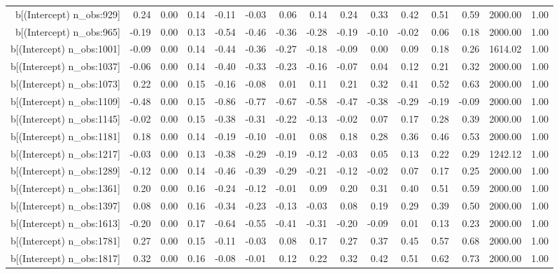 \begin{table}[ht]
\begin{tabular}{rrrrrrrrrrrrrrr}
  b[(Intercept) n\_obs:929] & 0.24 & 0.00 & 0.14 & -0.11 & -0.03 & 0.06 & 0.14 & 0.24 & 0.33 & 0.42 & 0.51 & 0.59 & 2000.00 & 1.00 \\ 
  b[(Intercept) n\_obs:965] & -0.19 & 0.00 & 0.13 & -0.54 & -0.46 & -0.36 & -0.28 & -0.19 & -0.10 & -0.02 & 0.06 & 0.18 & 2000.00 & 1.00 \\ 
  b[(Intercept) n\_obs:1001] & -0.09 & 0.00 & 0.14 & -0.44 & -0.36 & -0.27 & -0.18 & -0.09 & 0.00 & 0.09 & 0.18 & 0.26 & 1614.02 & 1.00 \\ 
  b[(Intercept) n\_obs:1037] & -0.06 & 0.00 & 0.14 & -0.40 & -0.33 & -0.23 & -0.16 & -0.07 & 0.04 & 0.12 & 0.21 & 0.32 & 2000.00 & 1.00 \\ 
  b[(Intercept) n\_obs:1073] & 0.22 & 0.00 & 0.15 & -0.16 & -0.08 & 0.01 & 0.11 & 0.21 & 0.32 & 0.41 & 0.52 & 0.63 & 2000.00 & 1.00 \\ 
  b[(Intercept) n\_obs:1109] & -0.48 & 0.00 & 0.15 & -0.86 & -0.77 & -0.67 & -0.58 & -0.47 & -0.38 & -0.29 & -0.19 & -0.09 & 2000.00 & 1.00 \\ 
  b[(Intercept) n\_obs:1145] & -0.02 & 0.00 & 0.15 & -0.38 & -0.31 & -0.22 & -0.13 & -0.02 & 0.07 & 0.17 & 0.28 & 0.39 & 2000.00 & 1.00 \\ 
  b[(Intercept) n\_obs:1181] & 0.18 & 0.00 & 0.14 & -0.19 & -0.10 & -0.01 & 0.08 & 0.18 & 0.28 & 0.36 & 0.46 & 0.53 & 2000.00 & 1.00 \\ 
  b[(Intercept) n\_obs:1217] & -0.03 & 0.00 & 0.13 & -0.38 & -0.29 & -0.19 & -0.12 & -0.03 & 0.05 & 0.13 & 0.22 & 0.29 & 1242.12 & 1.00 \\ 
  b[(Intercept) n\_obs:1289] & -0.12 & 0.00 & 0.14 & -0.46 & -0.39 & -0.29 & -0.21 & -0.12 & -0.02 & 0.07 & 0.17 & 0.25 & 2000.00 & 1.00 \\ 
  b[(Intercept) n\_obs:1361] & 0.20 & 0.00 & 0.16 & -0.24 & -0.12 & -0.01 & 0.09 & 0.20 & 0.31 & 0.40 & 0.51 & 0.59 & 2000.00 & 1.00 \\ 
  b[(Intercept) n\_obs:1397] & 0.08 & 0.00 & 0.16 & -0.34 & -0.23 & -0.13 & -0.03 & 0.08 & 0.19 & 0.29 & 0.39 & 0.50 & 2000.00 & 1.00 \\ 
  b[(Intercept) n\_obs:1613] & -0.20 & 0.00 & 0.17 & -0.64 & -0.55 & -0.41 & -0.31 & -0.20 & -0.09 & 0.01 & 0.13 & 0.23 & 2000.00 & 1.00 \\ 
  b[(Intercept) n\_obs:1781] & 0.27 & 0.00 & 0.15 & -0.11 & -0.03 & 0.08 & 0.17 & 0.27 & 0.37 & 0.45 & 0.57 & 0.68 & 2000.00 & 1.00 \\ 
  b[(Intercept) n\_obs:1817] & 0.32 & 0.00 & 0.16 & -0.08 & -0.01 & 0.12 & 0.22 & 0.32 & 0.42 & 0.51 & 0.62 & 0.73 & 2000.00 & 1.00 \\ 

\end{tabular}
\end{table}
